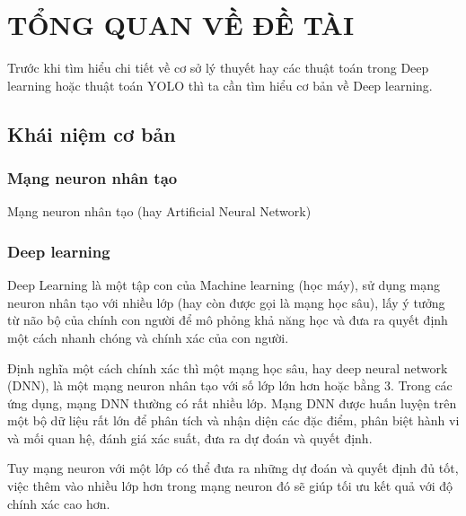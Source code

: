 \clearpage
{}

\setcounter{chapter}{0}
\chapter[{TỔNG QUAN VỀ ĐỀ TÀI}]{TỔNG QUAN VỀ ĐỀ TÀI}

Trước khi tìm hiểu chi tiết về cơ sở lý thuyết hay các thuật toán trong Deep learning hoặc thuật toán YOLO thì ta cần tìm hiểu cơ bản về Deep learning.   

\section{Khái niệm cơ bản}

\subsection{Mạng neuron nhân tạo}
Mạng neuron nhân tạo (hay Artificial Neural Network) 

\subsection{Deep learning}
Deep Learning là một tập con của Machine learning (học máy), sử dụng mạng neuron nhân tạo với nhiều lớp (hay còn được gọi là mạng học sâu), lấy ý tưởng từ não bộ của chính con người để mô phỏng khả năng học và đưa ra quyết định một cách nhanh chóng và chính xác của con người. 

Định nghĩa một cách chính xác thì một mạng học sâu, hay deep neural network (DNN), là một mạng neuron nhân tạo với số lớp lớn hơn hoặc bằng 3. Trong các ứng dụng, mạng DNN thường có rất nhiều lớp. Mạng DNN được huấn luyện trên một bộ dữ liệu rất lớn để phân tích và nhận diện các đặc điểm, phân biệt hành vi và mối quan hệ, đánh giá xác suất, đưa ra dự đoán và quyết định. 

Tuy mạng neuron với một lớp có thể đưa ra những dự đoán và quyết định đủ tốt, việc thêm vào nhiều lớp hơn trong mạng neuron đó sẽ giúp tối ưu kết quả với độ chính xác cao hơn.

\newpage
\section{}

